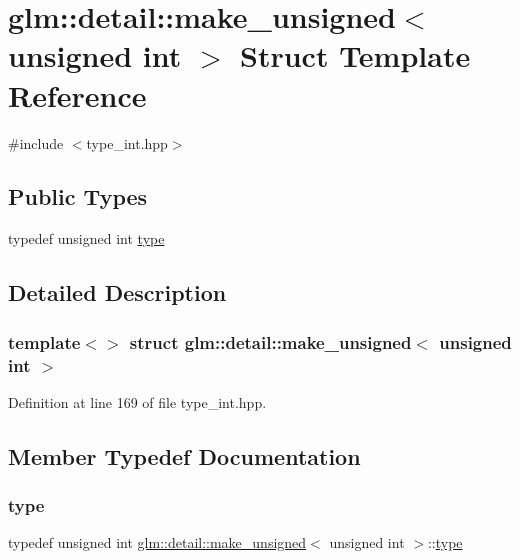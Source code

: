 \hypertarget{structglm_1_1detail_1_1make__unsigned_3_01unsigned_01int_01_4}{}\section{glm\+::detail\+::make\+\_\+unsigned$<$ unsigned int $>$ Struct Template Reference}
\label{structglm_1_1detail_1_1make__unsigned_3_01unsigned_01int_01_4}


{\ttfamily \#include $<$type\+\_\+int.\+hpp$>$}

\subsection*{Public Types}
\begin{DoxyCompactItemize}
\item 
typedef unsigned int \mbox{\hyperlink{structglm_1_1detail_1_1make__unsigned_3_01unsigned_01int_01_4_aea3e796456b317dd2247889d3fbb9d68}{type}}
\end{DoxyCompactItemize}


\subsection{Detailed Description}
\subsubsection*{template$<$$>$\newline
struct glm\+::detail\+::make\+\_\+unsigned$<$ unsigned int $>$}



Definition at line 169 of file type\+\_\+int.\+hpp.



\subsection{Member Typedef Documentation}
\mbox{\label{structglm_1_1detail_1_1make__unsigned_3_01unsigned_01int_01_4_aea3e796456b317dd2247889d3fbb9d68}} 
\subsubsection{\texorpdfstring{type}{type}}
{\footnotesize\ttfamily typedef unsigned int \mbox{\hyperlink{structglm_1_1detail_1_1make__unsigned}{glm\+::detail\+::make\+\_\+unsigned}}$<$ unsigned int $>$\+::\mbox{\hyperlink{structglm_1_1detail_1_1make__unsigned_3_01unsigned_01int_01_4_aea3e796456b317dd2247889d3fbb9d68}{type}}}



